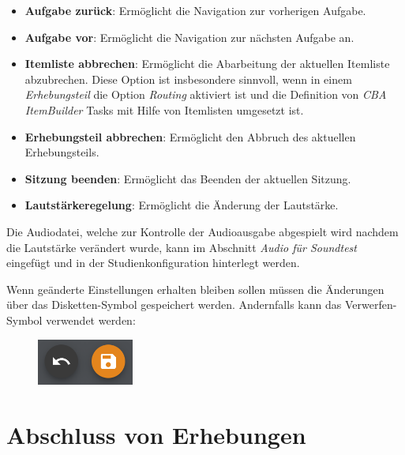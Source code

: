 \documentclass[
  letterpaper,
  DIV=11]{scrreprt}
\providecommand{\tightlist}{%
  \setlength{\itemsep}{0pt}\setlength{\parskip}{0pt}}\usepackage{longtable,booktabs,array}
\begin{document}
\begin{tcolorbox}
\begin{itemize}
\tightlist
\item
  \textbf{Aufgabe zurück}: Ermöglicht die Navigation zur vorherigen
  Aufgabe.
\item
  \textbf{Aufgabe vor}: Ermöglicht die Navigation zur nächsten Aufgabe
  an.
\item
  \textbf{Itemliste abbrechen}: Ermöglicht die Abarbeitung der aktuellen
  Itemliste abzubrechen. Diese Option ist insbesondere sinnvoll, wenn in
  einem \emph{Erhebungsteil} die Option \emph{Routing} aktiviert ist und
  die Definition von \emph{CBA ItemBuilder} Tasks mit Hilfe von
  Itemlisten umgesetzt ist.\\
\item
  \textbf{Erhebungsteil abbrechen}: Ermöglicht den Abbruch des aktuellen
  Erhebungsteils.
\item
  \textbf{Sitzung beenden}: Ermöglicht das Beenden der aktuellen
  Sitzung.
\item
  \textbf{Lautstärkeregelung}: Ermöglicht die Änderung der Lautstärke.
\end{itemize}

Die Audiodatei, welche zur Kontrolle der Audioausgabe abgespielt wird
nachdem die Lautstärke verändert wurde, kann im Abschnitt \emph{Audio
für Soundtest} eingefügt und in der Studienkonfiguration hinterlegt
werden.

Wenn geänderte Einstellungen erhalten bleiben sollen müssen die
Änderungen über das Disketten-Symbol gespeichert werden. Andernfalls
kann das Verwerfen-Symbol verwendet werden:

\begin{figure}[H]

\includegraphics[width=1.25in,height=\textheight]{img/screenshot-icons-undo-and-save-01.png} \hfill{}

\end{figure}

\end{tcolorbox}

\hypertarget{abschluss-von-erhebungen-1}{%
\section{Abschluss von Erhebungen}\label{abschluss-von-erhebungen-1}}
\end{document}
